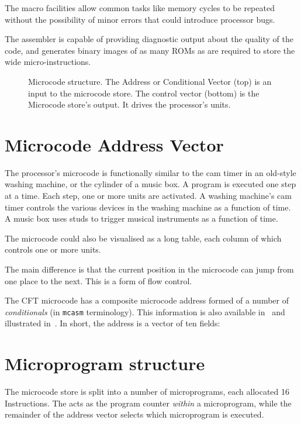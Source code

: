 The macro facilities allow common tasks like memory cycles to be repeated
without the possibility of minor errors that could introduce processor bugs.

The assembler is capable of providing diagnostic output about the quality of
the code, and generates binary images of as many ROMs as are required to store
the wide micro-instructions.


\begin{figure}
  \centering
  

  \caption[Microcode structure]{\label{fig:microcode-store2}Microcode
    structure. The Address or Conditional Vector (top) is an input to
    the microcode store. The control vector (bottom) is the Microcode
    store's output. It drives the processor's units. }
\end{figure}


\section{Microcode Address Vector}

The processor's microcode is functionally similar to the cam timer in an
old-style washing machine, or the cylinder of a music box. A program is
executed one step at a time. Each step, one or more units are activated. A
washing machine's cam timer controls the various devices in the washing machine
as a function of time. A music box uses studs to trigger musical instruments as
a function of time.

The microcode could also be visualised as a long table, each column of which
controls one or more units.

The main difference is that the current position in the microcode can jump from
one place to the next. This is a form of flow control.

The CFT microcode has a composite microcode address formed of a number of {\em
  conditionals\/} (in \texttt{mcasm} terminology). This information is also
available in~ and illustrated
in~. In short, the address is a vector of ten fields:



\section{Microprogram structure}

The microcode store is split into a number of microprograms, each allocated 16
Instructions. The \UPC{} acts as the program counter {\em within\/} a
microprogram, while the remainder of the address vector selects which
microprogram is executed.

